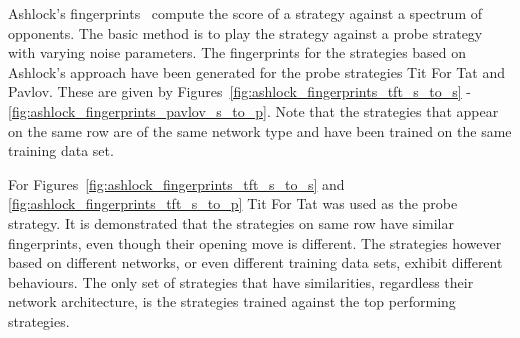Ashlock's fingerprints~\cite{Ashlock2005, Ashlock2008, Ashlock2009,
Ashlock2010, Ashlock2006a} compute the score of a strategy against a spectrum of
opponents. The basic method is to play the strategy against a probe strategy
with varying noise parameters. The fingerprints for the \lstmstrategies
strategies based on Ashlock's approach have been generated for the probe
strategies Tit For Tat and Pavlov. These are given by
Figures~\ref{fig:ashlock_fingerprints_tft_s_to_s} -
\ref{fig:ashlock_fingerprints_pavlov_s_to_p}. Note that the strategies that
appear on the same row are of the same network type and have been trained on
the same training data set.

For Figures~\ref{fig:ashlock_fingerprints_tft_s_to_s} and
\ref{fig:ashlock_fingerprints_tft_s_to_p} Tit For Tat was used as the probe
strategy. It is demonstrated that the strategies on same row have similar fingerprints,
even though their opening move is different. The strategies however based on
different networks, or even different training data sets, exhibit different
behaviours. The only set of strategies that have similarities, regardless their
network architecture, is the strategies trained against the top performing
strategies.

